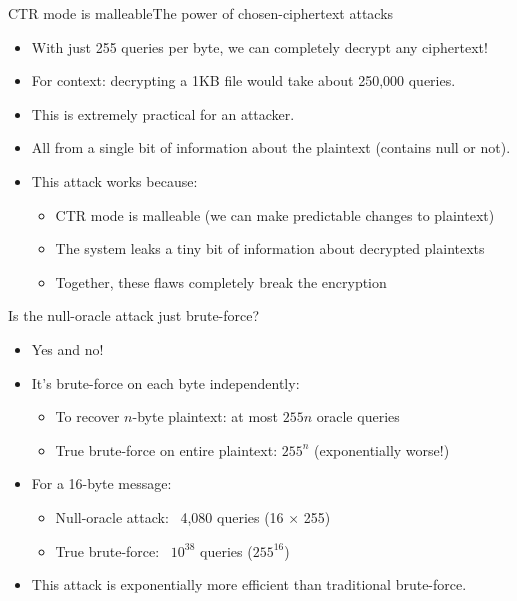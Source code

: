 \documentclass[aspectratio=169, lualatex, handout]{beamer}
\begin{document}
\begin{frame}{CTR mode is malleable}{The power of chosen-ciphertext attacks}
	\begin{itemize}[<+->]
		\item With just 255 queries per byte, we can completely decrypt any ciphertext!
		\item For context: decrypting a 1KB file would take about 250,000 queries.
		\item This is extremely practical for an attacker.
		\item All from a single bit of information about the plaintext (contains null or not).
		\item This attack works because:
		      \begin{itemize}
			      \item CTR mode is malleable (we can make predictable changes to plaintext)
			      \item The system leaks a tiny bit of information about decrypted plaintexts
			      \item Together, these flaws completely break the encryption
		      \end{itemize}
	\end{itemize}
\end{frame}

\begin{frame}{Is the null-oracle attack just brute-force?}
	\begin{itemize}[<+->]
		\item Yes and no!
		\item It's brute-force on each byte independently:
		      \begin{itemize}
			      \item To recover $n$-byte plaintext: at most $255n$ oracle queries
			      \item True brute-force on entire plaintext: $255^n$ (exponentially worse!)
		      \end{itemize}
		\item For a 16-byte message:
		      \begin{itemize}
			      \item Null-oracle attack: ~4,080 queries (16 × 255)
			      \item True brute-force: ~$10^{38}$ queries ($255^{16}$)
		      \end{itemize}
		\item This attack is exponentially more efficient than traditional brute-force.
	\end{itemize}
\end{frame}
\end{document}
